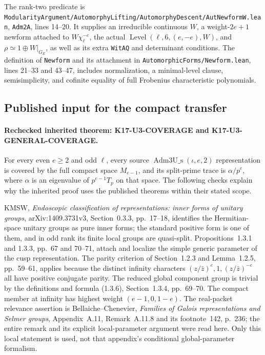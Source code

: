 The rank-two predicate is
\texttt{ModularityArgument/AutomorphyLifting/AutomorphyDescent/AutNewformW.lean},
\texttt{Adm2A}, lines 14--20.
It supplies an irreducible continuous $W$, a weight-$2e+1$
newform attached to $W\chi_\ell^{-e}$, the actual
$\operatorname{Level}(\ell,6,(e,-e),W)$, and
$\rho\simeq1\oplus W|_{G_E}$, as well as its extra
\texttt{WitAQ} and determinant conditions.
The definition of \texttt{Newform} and its attachment in
\texttt{AutomorphicForms/Newform.lean}, lines 21--33 and 43--47,
includes normalization, a minimal-level clause, semisimplicity,
and cofinite equality of full Frobenius characteristic polynomials.

\subsection{Published input for the compact transfer}

\paragraph{Rechecked inherited theorem: K17-U3-COVERAGE and
K17-U3-GENERAL-COVERAGE.}
For every even $e\geq2$ and odd $\ell$, every source
$\operatorname{Adm3U\_s}(\iota,e,2)$ representation is covered
by the full compact space $M_{e-1}$, and its split-prime trace is
$\alpha/p^e$, where $\alpha$ is an eigenvalue of
$p^{e-1}T_p$ on that space.
The following checks explain why the inherited proof uses the
published theorems within their stated scope.

KMSW, \emph{Endoscopic classification of representations: inner forms
of unitary groups}, arXiv:1409.3731v3, Section~0.3.3, pp.~17--18,
identifies the Hermitian-space unitary groups as pure inner forms;
the standard positive form is one of them, and in odd rank its finite
local groups are quasi-split.
Propositions~1.3.1 and 1.3.3, pp.~67 and 70--71, attach and localize
the simple generic parameter of the cusp representation.
The parity criterion of Section~1.2.3 and Lemma~1.2.5, pp.~59--61,
applies because the distinct infinity characters
$(z/\bar z)^e,1,(z/\bar z)^{-e}$ all have positive conjugate parity.
The reduced global component group is trivial by the definitions
and formula (1.3.6), Section~1.3.4, pp.~69--70.
The compact member at infinity has highest weight $(e-1,0,1-e)$.
The real-packet relevance assertion is Bellaiche--Chenevier,
\emph{Families of Galois representations and Selmer groups},
Appendix~A.11, Remark~A.11.8 and its footnote~142, p.~236;
the entire remark and its explicit local-parameter argument were
read here. Only this local statement is used, not that appendix's
conditional global-parameter formalism.

